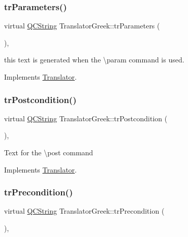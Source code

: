 \mbox{\label{class_translator_greek_a650335006e8ec633636e2348ead4e47a}} 
\subsubsection{\texorpdfstring{trParameters()}{trParameters()}}
{\footnotesize\ttfamily virtual \mbox{\hyperlink{class_q_c_string}{Q\+C\+String}} Translator\+Greek\+::tr\+Parameters (\begin{DoxyParamCaption}{ }\end{DoxyParamCaption})\hspace{0.3cm}{\ttfamily [inline]}, {\ttfamily [virtual]}}

this text is generated when the \textbackslash{}param command is used. 

Implements \mbox{\hyperlink{class_translator}{Translator}}.

\mbox{\label{class_translator_greek_aba12a6d6c1105097806b579fe057150a}} 
\subsubsection{\texorpdfstring{trPostcondition()}{trPostcondition()}}
{\footnotesize\ttfamily virtual \mbox{\hyperlink{class_q_c_string}{Q\+C\+String}} Translator\+Greek\+::tr\+Postcondition (\begin{DoxyParamCaption}{ }\end{DoxyParamCaption})\hspace{0.3cm}{\ttfamily [inline]}, {\ttfamily [virtual]}}

Text for the \textbackslash{}post command 

Implements \mbox{\hyperlink{class_translator}{Translator}}.

\mbox{\label{class_translator_greek_a6b8f76e8323537ee0d27e15514278c83}} 
\subsubsection{\texorpdfstring{trPrecondition()}{trPrecondition()}}
{\footnotesize\ttfamily virtual \mbox{\hyperlink{class_q_c_string}{Q\+C\+String}} Translator\+Greek\+::tr\+Precondition (\begin{DoxyParamCaption}{ }\end{DoxyParamCaption})\hspace{0.3cm}{\ttfamily [inline]}, {\ttfamily [virtual]}}

